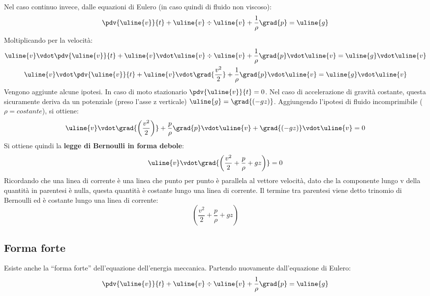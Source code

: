 Nel caso continuo invece, dalle equazioni di Eulero (in caso quindi di fluido non viscoso):
%
	\begin{equation*}
		\begin{gathered}
			\pdv{\uline{v}}{t} + \uline{v} \div{\uline{v}} + \frac{1}{\rho} \grad{p}  = \uline{g}\\
		\end{gathered}
	\end{equation*}
%		
Moltiplicando per la velocità:
%
	\begin{equation*}
		\begin{gathered}
			\uline{v} \vdot \pdv{\uline{v}}{t} + \uline{v} \vdot \uline{v} \div{\uline{v}} + \frac{1}{\rho} \grad{p}  \vdot \uline{v} = \uline{g} \vdot \uline{v}\\
			\uline{v} \vdot \pdv{\uline{v}}{t} + \uline{v} \vdot \grad{\frac{v^2}{2}} + \frac{1}{\rho} \grad{p}  \vdot \uline{v} = \uline{g} \vdot \uline{v}\\
		\end{gathered}
	\end{equation*}
%
Vengono aggiunte alcune ipotesi.
In caso di moto stazionario $\pdv{\uline{v}}{t} = 0$.
Nel caso di accelerazione di gravità costante, questa sicuramente deriva da un potenziale (preso l'asse z verticale) $\uline{g} = \grad{(-gz)}$.
Aggiungendo l'ipotesi di fluido incomprimibile ($\rho = costante$), si ottiene:
%
	\begin{equation*}
		\uline{v} \vdot \grad{\left( \frac{v^2}{2}\right)} + \frac{p}{\rho} \grad{p} \vdot \uline{v} + \grad{(- gz)} \vdot \uline{v} = 0
	\end{equation*}
%
Si ottiene quindi la \textbf{legge di Bernoulli in forma debole}:
%
	\begin{equation*}
		\uline{v} \vdot \grad{\left( \frac{v^2}{2} + \frac{p}{\rho} + gz \right)}  = 0
	\end{equation*}
%
Ricordando che una linea di corrente è una linea che punto per punto è parallela al vettore velocità, dato che la componente lungo v della quantità in parentesi è nulla, questa quantità è costante lungo una linea di corrente.
Il termine tra parentesi viene detto trinomio di Bernoulli ed è costante lungo una linea di corrente:
%
	\begin{equation*}
		\left( \frac{v^2}{2} + \frac{p}{\rho} + gz \right)
	\end{equation*}
%

\subsection{Forma forte}
Esiste anche la ``forma forte'' dell'equazione dell'energia meccanica.
Partendo nuovamente dall'equazione di Eulero:
%
	\begin{equation*}
		\pdv{\uline{v}}{t} + \uline{v} \div{\uline{v}} + \frac{1}{\rho} \grad{p}  = \uline{g}
	\end{equation*}
 
